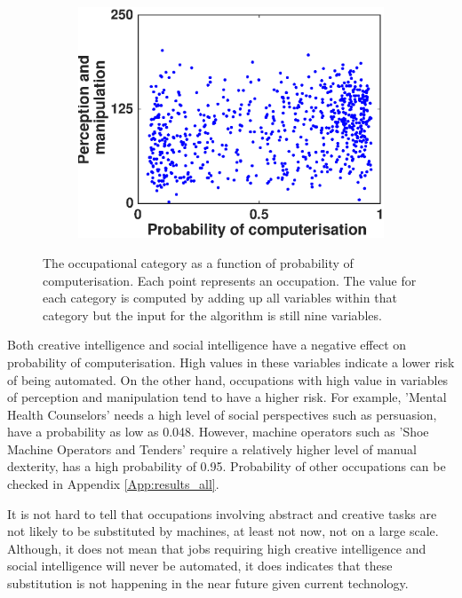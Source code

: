 \documentclass[11pt]{report}
\numberwithin{equation}{chapter}
\begin{document}
\begin{spacing}{2}
\begin{figure}[!htb]
\begin{subfigure}{0.55\textwidth}
\centering
	\includegraphics[scale = 0.5]{perception_and_manipulation.eps}
\end{subfigure}


\caption{The occupational category as a function of probability of computerisation. Each point represents an occupation. The value for each category is computed by adding up all variables within that category but the input for the algorithm is still nine variables.}
\label{fig:category2010}
\end{figure}

Both creative intelligence and social intelligence have a negative effect on probability of computerisation. High values in these variables indicate a lower risk of being automated. On the other hand, occupations with high value in variables of perception and manipulation tend to have a higher risk. For example, 'Mental Health Counselors' needs a high level of social perspectives such as persuasion, have a probability as low as 0.048. However, machine operators such as 'Shoe Machine Operators and Tenders' require a relatively higher level of manual dexterity, has a high probability of 0.95. Probability of other occupations can be checked in Appendix \ref{App:results_all}.

It is not hard to tell that occupations involving abstract and creative tasks are not likely to be substituted by machines, at least not now, not on a large scale. Although, it does not mean that jobs requiring high creative intelligence and social intelligence will never be automated, it does indicates that these substitution is not happening in the near future given current technology. 


\end{spacing}
\end{document}
